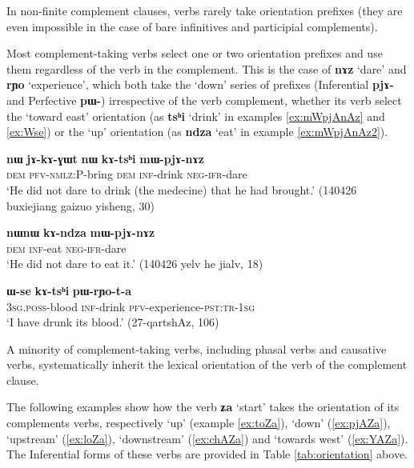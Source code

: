 \documentclass[oneside,a4paper,11pt]{article}
\newcommand{\ipa}[1]{\textbf{\phon#1}} %
\newcommand{\jpg}[2]{\ipa{#1} `#2'} %
\newcommand{\refb}[1]{(\ref{#1})}
\begin{document}
In non-finite complement clauses, verbs rarely take orientation prefixes (they are even impossible in the case of bare infinitives and participial complements).

Most complement-taking verbs select one or two orientation prefixes and use them regardless of the verb in the complement. This is the case of \jpg{nɤz}{dare} and  \jpg{rɲo}{experience}, which both take the `down' series of prefixes (Inferential \ipa{pjɤ-} and Perfective \ipa{pɯ-}) irrespective of the verb complement, whether its verb select the `toward east' orientation (as \jpg{tsʰi}{drink} in examples \ref{ex:mWpjAnAz} and \ref{ex:Wse}) or the `up' orientation (as \jpg{ndza}{eat} in example \ref{ex:mWpjAnAz2}).

\begin{exe}
\ex \label{ex:mWpjAnAz}
\gll \ipa{nɯ} 	\ipa{jɤ-kɤ-ɣɯt} 	\ipa{nɯ} 	\ipa{kɤ-tsʰi} 	\ipa{mɯ-pjɤ-nɤz} \\
\textsc{dem} \textsc{pfv-nmlz}:P-bring \textsc{dem} \textsc{inf}-drink \textsc{neg-ifr}-dare \\
\glt `He did not dare to drink (the medecine) that he had brought.' (140426 buxiejiang gaizuo yisheng, 30)
\end{exe}
\begin{exe}
\ex \label{ex:mWpjAnAz2}
\gll
\ipa{nɯnɯ} 	\ipa{kɤ-ndza} 	\ipa{mɯ-pjɤ-nɤz} \\
\textsc{dem} \textsc{inf}-eat \textsc{neg-ifr}-dare \\
\glt `He did not dare to eat it.' (140426 yelv he jialv, 18)
\end{exe}

\begin{exe}
\ex \label{ex:Wse}
\gll
\ipa{ɯ-se} 	\ipa{kɤ-tsʰi} 	\ipa{pɯ-rɲo-t-a} \\
\textsc{3sg.poss}-blood \textsc{inf}-drink \textsc{pfv}-experience-\textsc{pst:tr-1sg} \\
\glt `I have drunk its blood.' (27-qartshAz, 106)
\end{exe}

A minority of complement-taking verbs, including phasal verbs and causative verbs, systematically inherit the lexical orientation of the verb of the complement clause. 

The following examples show how the verb \jpg{ʑa}{start} takes the orientation of its complements verbs, respectively `up' (example \ref{ex:toZa}), `down' \refb{ex:pjAZa}, `upstream' \refb{ex:loZa}, `downstream' \refb{ex:chAZa} and `towards west' \refb{ex:YAZa}. The Inferential forms of these verbs are provided in Table \ref{tab:orientation} above.
\end{document}
